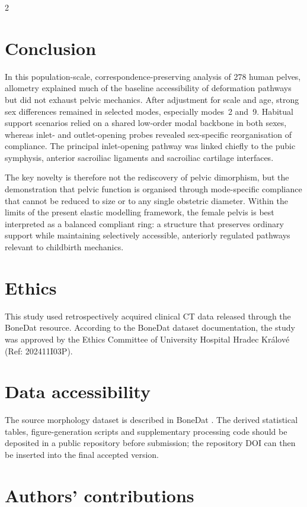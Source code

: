 \documentclass[openacc]{rsproca_new}
\begin{document}
\begin{multicols}{2}
\section{Conclusion}

In this population-scale, correspondence-preserving analysis of 278 human pelves, allometry explained much of the baseline accessibility of deformation pathways but did not exhaust pelvic mechanics. After adjustment for scale and age, strong sex differences remained in selected modes, especially modes~2 and~9. Habitual support scenarios relied on a shared low-order modal backbone in both sexes, whereas inlet- and outlet-opening probes revealed sex-specific reorganisation of compliance. The principal inlet-opening pathway was linked chiefly to the pubic symphysis, anterior sacroiliac ligaments and sacroiliac cartilage interfaces.

The key novelty is therefore not the rediscovery of pelvic dimorphism, but the demonstration that pelvic function is organised through mode-specific compliance that cannot be reduced to size or to any single obstetric diameter. Within the limits of the present elastic modelling framework, the female pelvis is best interpreted as a balanced compliant ring: a structure that preserves ordinary support while maintaining selectively accessible, anteriorly regulated pathways relevant to childbirth mechanics.

\section*{Ethics}

This study used retrospectively acquired clinical CT data released through the BoneDat resource. According to the BoneDat dataset documentation, the study was approved by the Ethics Committee of University Hospital Hradec Kr\'{a}lov\'{e} (Ref: 202411I03P).

\section*{Data accessibility}

The source morphology dataset is described in BoneDat \cite{HenysKuchar2025}. The derived statistical tables, figure-generation scripts and supplementary processing code should be deposited in a public repository before submission; the repository DOI can then be inserted into the final accepted version.

\section*{Authors' contributions}


\end{multicols}
\end{document}
